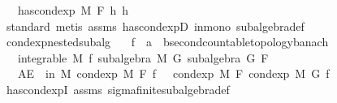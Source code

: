 \begin{isabellebody}
\ \ \ {\isachardoublequoteopen}has{\isacharunderscore}{\kern0pt}cond{\isacharunderscore}{\kern0pt}exp\ M\ F\ h{\isacharprime}{\kern0pt}\ h{\isachardoublequoteclose}\isanewline
%
\isadelimproof
\ \ %
\endisadelimproof
%
\isatagproof
{}\isamarkupfalse%
\ standard\ {\isacharparenleft}{\kern0pt}metis\ assms\ has{\isacharunderscore}{\kern0pt}cond{\isacharunderscore}{\kern0pt}expD\ in{\isacharunderscore}{\kern0pt}mono\ subalgebra{\isacharunderscore}{\kern0pt}def{\isacharparenright}{\kern0pt}{\isacharplus}{\kern0pt}%
\endisatagproof
{\isafoldproof}%
%
\isadelimproof
\isanewline
%
\endisadelimproof
\isanewline
{}\isamarkupfalse%
\ cond{\isacharunderscore}{\kern0pt}exp{\isacharunderscore}{\kern0pt}nested{\isacharunderscore}{\kern0pt}subalg{\isacharcolon}{\kern0pt}\isanewline
\ \ \ f\ {\isacharcolon}{\kern0pt}{\isacharcolon}{\kern0pt}\ {\isachardoublequoteopen}{\isacharprime}{\kern0pt}a\ {\isasymRightarrow}\ {\isacharprime}{\kern0pt}b{\isacharcolon}{\kern0pt}{\isacharcolon}{\kern0pt}{\isacharbraceleft}{\kern0pt}second{\isacharunderscore}{\kern0pt}countable{\isacharunderscore}{\kern0pt}topology{\isacharcomma}{\kern0pt}banach{\isacharbraceright}{\kern0pt}{\isachardoublequoteclose}\isanewline
\ \ \ {\isachardoublequoteopen}integrable\ M\ f{\isachardoublequoteclose}\ {\isachardoublequoteopen}subalgebra\ M\ G{\isachardoublequoteclose}\ {\isachardoublequoteopen}subalgebra\ G\ F{\isachardoublequoteclose}\isanewline
\ \ \ {\isachardoublequoteopen}AE\ {\isasymxi}\ in\ M{\isachardot}{\kern0pt}\ cond{\isacharunderscore}{\kern0pt}exp\ M\ F\ f\ {\isasymxi}\ {\isacharequal}{\kern0pt}\ cond{\isacharunderscore}{\kern0pt}exp\ M\ F\ {\isacharparenleft}{\kern0pt}cond{\isacharunderscore}{\kern0pt}exp\ M\ G\ f{\isacharparenright}{\kern0pt}\ {\isasymxi}{\isachardoublequoteclose}\isanewline
%
\isadelimproof
\ \ %
\endisadelimproof
%
\isatagproof
{}\isamarkupfalse%
\ has{\isacharunderscore}{\kern0pt}cond{\isacharunderscore}{\kern0pt}expI\ assms\ sigma{\isacharunderscore}{\kern0pt}finite{\isacharunderscore}{\kern0pt}subalgebra{\isacharunderscore}{\kern0pt}def\ \isamarkupfalse%

\end{isabellebody}

